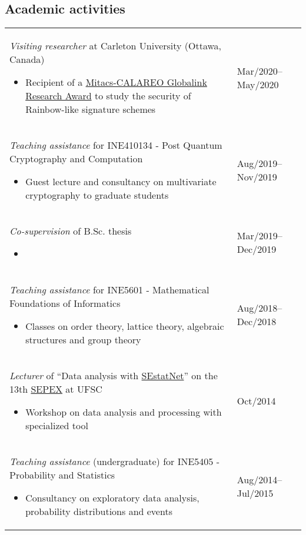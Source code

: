 \documentclass[12pt]{article}
\makeatletter
\newenvironment{datetable}
  {\newcolumntype{R}{>{\raggedleft\arraybackslash}p{0.14\textwidth}}
   \newcolumntype{L}{p{0.82\textwidth}}
   \begin{tabular}{@{\hspace{0mm}}LR}}
  {\end{tabular}}
\newenvironment{contenttable}[1]
  {\subsection*{#1}
   \begin{datetable}}
  {\end{datetable}}
\makeatother
\begin{document}
\begin{contenttable}{Academic activities}
  \emph{Visiting researcher} at Carleton University (Ottawa, Canada)
  \begin{itemize}
    \item Recipient of a \href{http://archive.is/RHxm4}{Mitacs-CALAREO
        Globalink Research Award} to study the security of Rainbow-like
          signature schemes
  \end{itemize} & Mar/2020--May/2020 \\

  \emph{Teaching assistance} for INE410134 - Post Quantum Cryptography and
    Computation
  \begin{itemize}
    \item Guest lecture and consultancy on multivariate cryptography to
        graduate students
  \end{itemize} & Aug/2019--Nov/2019 \\

  \emph{Co-supervision} of B.Sc. thesis
  \begin{itemize}
    \item {}
  \end{itemize} & Mar/2019--Dec/2019 \\

  \emph{Teaching assistance} for INE5601 - Mathematical Foundations of
    Informatics
  \begin{itemize}
    \item Classes on order theory, lattice theory, algebraic structures and
        group theory
  \end{itemize} & Aug/2018--Dec/2018 \\

  \emph{Lecturer} of ``Data analysis with
    \href{http://sestatnet.ufsc.br}{SEstatNet}'' on the 13th
    \href{https://sepex.ufsc.br/}{SEPEX} at UFSC
  \begin{itemize}
    \item Workshop on data analysis and processing with specialized tool
  \end{itemize} & Oct/2014 \\

  \emph{Teaching assistance} (undergraduate) for INE5405 - Probability and
    Statistics
  \begin{itemize}
    \item Consultancy on exploratory data analysis, probability distributions
        and events
  \end{itemize} & Aug/2014--Jul/2015 \\
\end{contenttable}
\end{document}
